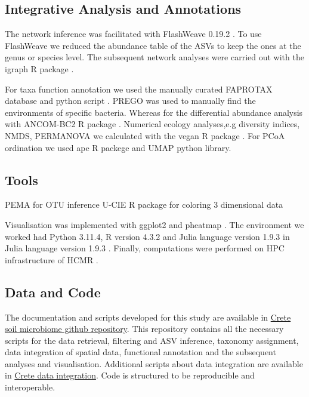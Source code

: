 \subsection{Integrative Analysis and Annotations}\label{int_analysis}
The network inference was facilitated with FlashWeave 0.19.2 \parencite{Tackmann2019}.
To use FlashWeave we reduced 
the abundance table of the ASVs to keep the ones at the genus or species level.
The subsequent network analyses were carried out
with the igraph R package \parencite{Csardi2006}.

For taxa function annotation we used the manually curated FAPROTAX database and python script \parencite{loucaDecouplingFunctionTaxonomy2016}.
PREGO \parencite{microorganisms10020293} was used to manually find the environments of specific bacteria.
Whereas for the differential abundance analysis with ANCOM-BC2 R package \parencite{Lin2023}.
Numerical ecology analyses,e.g diversity indices, NMDS, PERMANOVA we calculated
with the vegan R package \parencite{oksanen2024vegan}.
For PCoA ordination we used ape R packege \parencite{Paradis2004} and UMAP python library\parencite{mcinnes2018umap-software}.

\subsection{Tools}\label{Coding environment}
PEMA for OTU inference \parencite{zafeiropoulos2020pema}
U-CIE R package for coloring 3 dimensional data \parencite{Koutrouli2022}

Visualisation was implemented with ggplot2 \parencite{wickham_ggplot2_2016} and pheatmap \parencite{Kolde2019}.
The environment we worked had Python 3.11.4, R version 4.3.2 \parencite{rcoreteam}
and Julia language version 1.9.3 \parencite{Julia-2017}in Julia language version 1.9.3 \parencite{Julia-2017}.
Finally, computations were performed on HPC infrastructure of HCMR \parencite{zafeiropoulos_0s_2021}.

\subsection{Data and Code}
The documentation and scripts developed for this study are available in
\href{https://github.com/savvas-paragkamian/crete_soil_microbiome/}{Crete soil microbiome github repository}.
This repository contains all the necessary scripts for the data retrieval,
filtering and ASV inference, taxonomy assignment, data integration of spatial data, 
functional annotation and the subsequent analyses and visualisation.
Additional scripts about data integration are available in
\href{https://github.com/savvas-paragkamian/crete-data-integration}{Crete data integration}.
Code is structured to be reproducible and interoperable.

